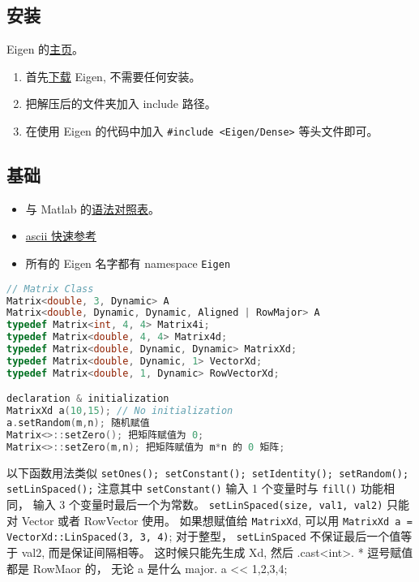 
\subsection{安装}
Eigen 的\href{http://eigen.tuxfamily.org/index.php?title=Main_Page}{主页}。
\begin{enumerate}
\item 首先\href{http://eigen.tuxfamily.org/index.php?title=Main_Page#Documentation}{下载} Eigen, 不需要任何安装。
\item 把解压后的文件夹加入 include 路径。
\item 在使用 Eigen 的代码中加入 \verb|#include <Eigen/Dense>| 等头文件即可。
\end{enumerate}

\subsection{基础}
\begin{itemize}
\item 与 Matlab 的\href{https://eigen.tuxfamily.org/dox/AsciiQuickReference.txt}{语法对照表}。
\item \href{https://eigen.tuxfamily.org/dox/AsciiQuickReference.txt}{ascii 快速参考}
\item 所有的 Eigen 名字都有 namespace \verb|Eigen|
\end{itemize}

\begin{lstlisting}[language=cpp]
// Matrix Class
Matrix<double, 3, Dynamic> A
Matrix<double, Dynamic, Dynamic, Aligned | RowMajor> A
typedef Matrix<int, 4, 4> Matrix4i;
typedef Matrix<double, 4, 4> Matrix4d;
typedef Matrix<double, Dynamic, Dynamic> MatrixXd;
typedef Matrix<double, Dynamic, 1> VectorXd;
typedef Matrix<double, 1, Dynamic> RowVectorXd;

declaration & initialization
MatrixXd a(10,15); // No initialization
a.setRandom(m,n); 随机赋值
Matrix<>::setZero(); 把矩阵赋值为 0;
Matrix<>::setZero(m,n); 把矩阵赋值为 m*n 的 0 矩阵;
\end{lstlisting}

以下函数用法类似
\verb|setOnes(); setConstant(); setIdentity(); setRandom(); setLinSpaced();|
注意其中 \verb|setConstant()| 输入 1 个变量时与 \verb|fill()| 功能相同， 输入 3 个变量时最后一个为常数。 \verb|setLinSpaced(size, val1, val2)| 只能对 Vector 或者 RowVector 使用。 如果想赋值给 \verb|MatrixXd|, 可以用 \verb|MatrixXd a = VectorXd::LinSpaced(3, 3, 4)|; 对于整型， \verb|setLinSpaced| 不保证最后一个值等于 val2, 而是保证间隔相等。 这时候只能先生成 Xd, 然后 .cast<int>.
* 逗号赋值都是 RowMaor 的， 无论 a 是什么 major.
a << 1,2,3,4;

